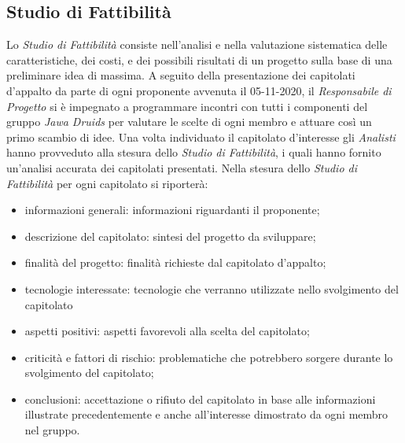 \subsection{Studio di Fattibilità}\label{2.1.2}
Lo \textit{Studio di Fattibilità} consiste nell'analisi e nella valutazione sistematica delle caratteristiche, dei costi, e dei possibili risultati di un progetto sulla base di una preliminare idea di massima.
A seguito della presentazione dei capitolati d'appalto da parte di ogni proponente avvenuta il 05-11-2020, il \textit{Responsabile di Progetto} si è impegnato a programmare incontri con tutti i componenti del gruppo \textit{Jawa Druids} per valutare le scelte di ogni membro e attuare così un primo scambio di idee. Una volta individuato il capitolato d'interesse gli \textit{Analisti} hanno provveduto alla stesura dello \textit{Studio di Fattibilità}, i quali hanno fornito un'analisi accurata dei capitolati presentati.
Nella stesura dello \textit{Studio di Fattibilità} per ogni capitolato si riporterà:
\begin{itemize}
	\item informazioni generali: informazioni riguardanti il proponente;
	\item descrizione del capitolato: sintesi del progetto da sviluppare; 
	\item finalità del progetto: finalità richieste dal capitolato d'appalto;
	\item tecnologie interessate: tecnologie che verranno utilizzate nello svolgimento del capitolato
	\item aspetti positivi: aspetti favorevoli alla scelta del capitolato;
	\item criticità e fattori di rischio: problematiche che potrebbero sorgere durante lo svolgimento del capitolato;
	\item conclusioni: accettazione o rifiuto del capitolato in base alle informazioni illustrate precedentemente e anche all'interesse dimostrato da ogni membro nel gruppo.
\end{itemize}
